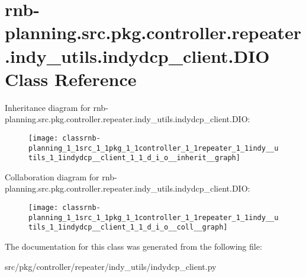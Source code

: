 \hypertarget{classrnb-planning_1_1src_1_1pkg_1_1controller_1_1repeater_1_1indy__utils_1_1indydcp__client_1_1_d_i_o}{}\section{rnb-\/planning.src.\+pkg.\+controller.\+repeater.\+indy\+\_\+utils.\+indydcp\+\_\+client.\+D\+IO Class Reference}
\label{classrnb-planning_1_1src_1_1pkg_1_1controller_1_1repeater_1_1indy__utils_1_1indydcp__client_1_1_d_i_o}


Inheritance diagram for rnb-\/planning.src.\+pkg.\+controller.\+repeater.\+indy\+\_\+utils.\+indydcp\+\_\+client.\+D\+IO\+:\nopagebreak
\begin{figure}[H]
\begin{center}
\leavevmode
\texttt{[image: classrnb-planning\_1\_1src\_1\_1pkg\_1\_1controller\_1\_1repeater\_1\_1indy\_\_utils\_1\_1indydcp\_\_client\_1\_1\_d\_i\_o\_\_inherit\_\_graph]}
\end{center}
\end{figure}


Collaboration diagram for rnb-\/planning.src.\+pkg.\+controller.\+repeater.\+indy\+\_\+utils.\+indydcp\+\_\+client.\+D\+IO\+:\nopagebreak
\begin{figure}[H]
\begin{center}
\leavevmode
\texttt{[image: classrnb-planning\_1\_1src\_1\_1pkg\_1\_1controller\_1\_1repeater\_1\_1indy\_\_utils\_1\_1indydcp\_\_client\_1\_1\_d\_i\_o\_\_coll\_\_graph]}
\end{center}
\end{figure}


The documentation for this class was generated from the following file\+:\begin{DoxyCompactItemize}
\item 
src/pkg/controller/repeater/indy\+\_\+utils/indydcp\+\_\+client.\+py\end{DoxyCompactItemize}
